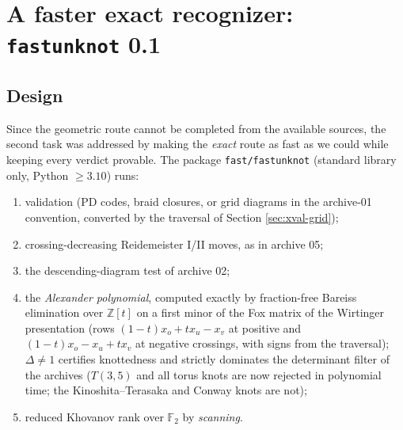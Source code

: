 \documentclass[11pt]{article}
\theoremstyle{remark}
\newcommand{\F}{\mathbb{F}_2}
\newcommand{\code}[1]{\texttt{#1}}
\begin{document}
\section{A faster exact recognizer: \code{fastunknot} 0.1}
\label{sec:fast}

\subsection{Design}
Since the geometric route cannot be completed from the available sources,
the second task was addressed by making the \emph{exact} route as fast as we
could while keeping every verdict provable. The package \code{fast/fastunknot}
(standard library only, Python $\ge3.10$) runs:
\begin{enumerate}
\item validation (PD codes, braid closures, or grid diagrams in the archive-01
  convention, converted by the traversal of Section \ref{sec:xval-grid});
\item crossing-decreasing Reidemeister I/II moves, as in archive 05;
\item the descending-diagram test of archive 02;
\item the \emph{Alexander polynomial}, computed exactly by fraction-free
  Bareiss elimination over $\mathbb Z[t]$ on a first minor of the Fox matrix
  of the Wirtinger presentation (rows $(1-t)x_o+tx_u-x_v$ at positive and
  $(1-t)x_o-x_u+tx_v$ at negative crossings, with signs from the traversal);
  $\Delta\ne1$ certifies knottedness and strictly dominates the determinant
  filter of the archives ($T(3,5)$ and all torus knots are now rejected in
  polynomial time; the Kinoshita--Terasaka and Conway knots are not);
\item reduced Khovanov rank over $\F$ by \emph{scanning}.
\end{enumerate}
\end{document}
